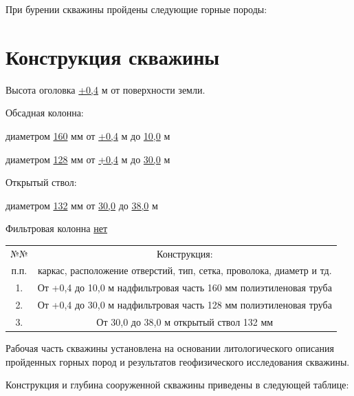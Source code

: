 \documentclass[a4paper,12pt]{article} %
\DeclareRobustCommand{\diameter}{%
	\text{\usefont{LS1}{stixscr}{m}{n}\symbol{"60}}%
}
\begin{document}
	\bigskip
	
	При бурении скважины пройдены следующие горные породы:
	
	\section*{Конструкция скважины}

	Высота оголовка	\underline{+0,4} м	от поверхности земли. 
	
	\bigskip

	Обсадная колонна:

	диаметром \underline{160} мм от \underline{+0,4} м до \underline{10,0}  м  		
	
	диаметром \underline{128} мм от \underline{+0,4} м до \underline{30,0} м
	
	\bigskip

	Открытый ствол:

	 диаметром \underline{132} мм от \underline{30,0} до \underline{38,0} м 
    
    \bigskip
	
	Фильтровая колонна \underline{нет}
	
	\bigskip

\begin{tabular}{|c|c|}
	\hline 
	\rule[-1ex]{0pt}{2.5ex} №№ & Конструкция: \\ 
	\rule[-1ex]{0pt}{2.5ex} п.п. & каркас, расположение отверстий, тип, сетка, проволока, диаметр и тд. \\ 
	\hline 
	\rule[-1ex]{0pt}{2.5ex} 1. & От +0,4 до 10,0 м   надфильтровая часть \diameter 160 мм полиэтиленовая труба \\ 
	\hline 
	\rule[-1ex]{0pt}{2.5ex} 2. & От +0,4 до 30,0 м   надфильтровая часть \diameter 128 мм полиэтиленовая труба \\ 
	\hline 
	\rule[-1ex]{0pt}{2.5ex} 3. & От 30,0 до 38,0 м   открытый ствол \diameter 132 мм \\ 
	\hline 
\end{tabular} 

\bigskip

Рабочая часть скважины установлена на основании литологического описания пройденных горных пород и результатов геофизического исследования скважины.


Конструкция и глубина сооруженной скважины приведены в следующей таблице:

\bigskip
\end{document}
